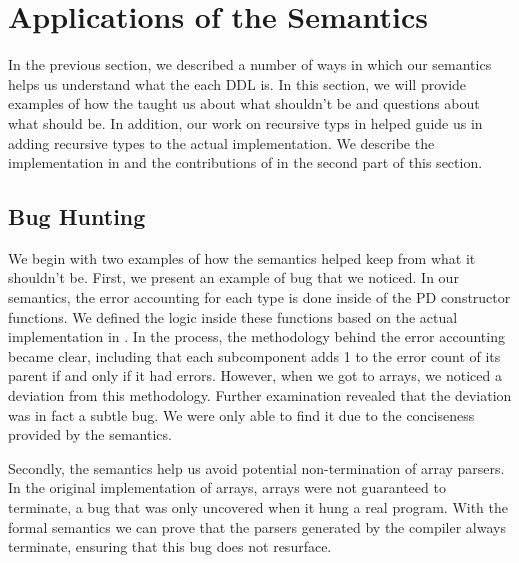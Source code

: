 \section{Applications of the Semantics}
\label{sec:applications}

In the previous section, we described a number of ways in which our
semantics helps us understand what the each DDL is. In this section,
we will provide examples of how the \ddc{} taught us about what
shouldn't be and questions about what \pads{} should be. In addition,
our work on recursive typs in \ddc{} helped guide us in adding
recursive types to the actual \pads{} implementation. We describe the
implementation in \pads{} and the contributions of \ddc{} in the
second part of this section.


\subsection{Bug Hunting}

We begin with two examples of how the semantics helped keep \pads{}
from what it shouldn't be. First, we present an example of bug that we
noticed. In our semantics, the error accounting for each type is done
inside of the PD constructor functions. We defined the logic inside
these functions based on the actual implementation in \pads{}. In the
process, the methodology behind the error accounting became clear,
including that each subcomponent adds 1 to the error count of its
parent if and only if it had errors. However, when we got to arrays,
we noticed a deviation from this methodology. Further examination
revealed that the deviation was in fact a subtle bug. We were only
able to find it due to the conciseness provided by the semantics.

Secondly, the semantics help us avoid potential non-termination of
array parsers. In the original implementation of \pads{} arrays,
arrays were not guaranteed to terminate, a bug that was only uncovered
when it hung a real program. With the formal semantics we can prove
that the parsers generated by the compiler always terminate, ensuring
that this bug does not resurface.


